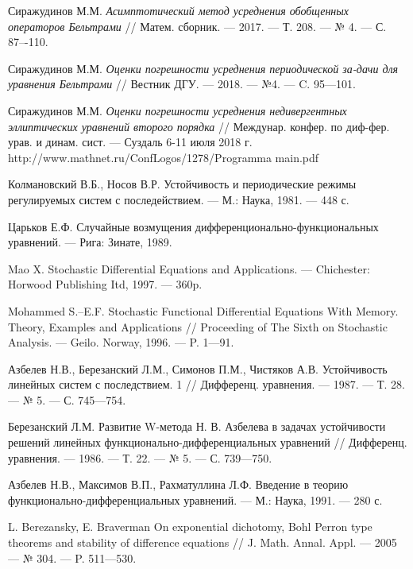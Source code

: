 \begin{thebibliography}{111}
 Сиражудинов М.М. \emph{ Асимптотический метод усреднения обобщенных операторов Бельтрами} // Матем. сборник. --- 2017. --- Т. 208. --- № 4. --- С. 87–-110.

 Сиражудинов М.М. \emph{Оценки погрешности усреднения периодической за-дачи для уравнения Бельтрами} // Вестник ДГУ. --- 2018. --- №4. --- C. 95---101.

 Сиражудинов М.М. \emph{Оценки погрешности усреднения недивергентных эллиптических уравнений второго порядка} // Междунар. конфер. по диф-фер. урав. и динам. сист. --- Суздаль 6-11 июля 2018 г. http://www.mathnet.ru/ConfLogos/1278/Programma main.pdf






	Колмановский В.Б., Носов В.Р. Устойчивость и периодические режимы регулируемых систем с последействием. --- М.: Наука, 1981. --- 448 с.
	
	Царьков Е.Ф. Случайные возмущения дифференционально-функциональных уравнений. --- Рига: Зинате, 1989.
	
	Mao X. Stochastic Differential Equations and Applications. --- Chichester: Horwood Publishing Itd, 1997. --- 360p.
	
	Mohammed S.--E.F. Stochastic Functional Differential Equations With Memory. Theory, Examples and Applications // Proceeding of The Sixth on Stochastic Analysis. --- Geilo. Norway, 1996. --- P. 1---91.
	
	Азбелев Н.В., Березанский Л.М., Симонов П.М., Чистяков А.В. Устойчивость линейных систем с последствием. 1 // Дифференц. уравнения. --- 1987. --- Т. 28. --- № 5. --- С. 745---754.
	
	Березанский Л.М. Развитие W-метода Н. В. Азбелева в задачах устойчивости решений линейных функционально-дифференциальных уравнений // Дифференц. уравнения. --- 1986. --- Т. 22. --- № 5. --- С. 739---750.
	
	Азбелев Н.В., Максимов В.П., Рахматуллина Л.Ф. Введение в теорию функционально-дифференциальных уравнений. --- М.: Наука, 1991. --- 280 с.
	
	L. Berezansky, E. Braverman On exponential dichotomy, Bohl Perron type theorems and stability of difference equations // J. Math. Annal. Appl. --- 2005 --- № 304. --- P. 511---530.
	

\end{thebibliography}
